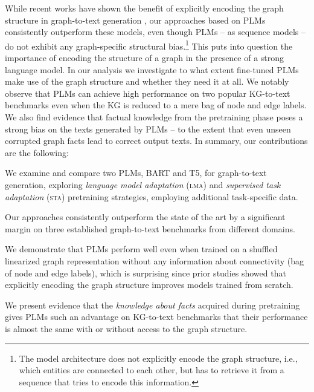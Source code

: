 \documentclass[11pt,a4paper]{article}
\begin{document}
While recent works have shown the benefit of explicitly encoding the graph structure in graph-to-text generation \cite{song-etal-acl2018, ribeiro-etal-2019-enhancing, ribeiro2020modeling,schmitt2020modeling, zhao-etal-2020-bridging}, our approaches based on PLMs consistently outperform these models, even though PLMs -- as sequence models -- do not exhibit any graph-specific structural bias.\footnote{The model architecture does not explicitly encode the graph structure, i.e., which entities are connected to each other, but has to retrieve it from a sequence that tries to encode this information.} This puts into question the importance of encoding the structure of a graph 
in the presence of a strong language model.
In our analysis
we investigate to what extent fine-tuned PLMs make use of the graph structure and whether they need it at all.
We notably observe that PLMs can achieve high performance on two popular KG-to-text benchmarks even when the KG is reduced to a mere bag of node and edge labels.
We also find evidence that factual knowledge from the pretraining phase poses a strong bias on the texts generated by PLMs -- to the extent that even unseen corrupted graph facts lead to correct output texts.
In summary, our contributions are the following:
\begin{enumerate*}[label=(\arabic*)]
    \item We examine and compare two PLMs, BART and T5, for graph-to-text generation, exploring \emph{language model adaptation} (\textsc{lma}) and \emph{supervised task adaptation} (\textsc{sta}) pretraining strategies, employing additional task-specific data.\item Our approaches consistently outperform the state of the art by a significant margin on three established graph-to-text benchmarks from different domains. 
    \item We demonstrate that PLMs perform well even when trained on a shuffled linearized graph representation without any information about connectivity (bag of node and edge labels), which is surprising since prior studies showed that explicitly encoding the graph structure improves models trained from scratch.
    \item We present evidence that the \emph{knowledge about facts} acquired during pretraining gives PLMs such an advantage on KG-to-text benchmarks that their performance is almost the same with or without access to the graph structure. 



\end{enumerate*}
\end{document}
